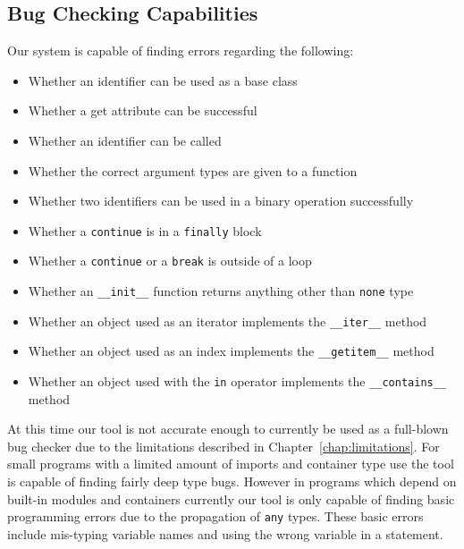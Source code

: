\documentclass[12pt, titlepage]{article}
\begin{document}
\subsection{Bug Checking Capabilities}
Our system is capable of finding errors regarding the following:
\begin{itemize}
	\item Whether an identifier can be used as a base class
	\item Whether a get attribute can be successful
	\item Whether an identifier can be called
	\item Whether the correct argument types are given to a function
	\item Whether two identifiers can be used in a binary operation successfully
	\item Whether a \texttt{continue} is in a \texttt{finally} block
	\item Whether a \texttt{continue} or a \texttt{break} is outside of a loop
	\item Whether an \texttt{\_\_init\_\_} function returns anything other than \texttt{none} type
	\item Whether an object used as an iterator implements the \texttt{\_\_iter\_\_} method
	\item Whether an object used as an index implements the \texttt{\_\_getitem\_\_} method
	\item Whether an object used with the \texttt{in} operator implements the \texttt{\_\_contains\_\_} method
\end{itemize}
At this time our tool is not accurate enough to currently be used as a full-blown bug checker due to the limitations described in Chapter~\ref{chap:limitations}. For small programs with a limited amount of imports and container type use the tool is capable of finding fairly deep type bugs. However in programs which depend on built-in modules and containers currently our tool is only capable of finding basic programming errors due to the propagation of \texttt{any} types. These basic errors include mis-typing variable names and using the wrong variable in a statement.

\newpage
\end{document}
